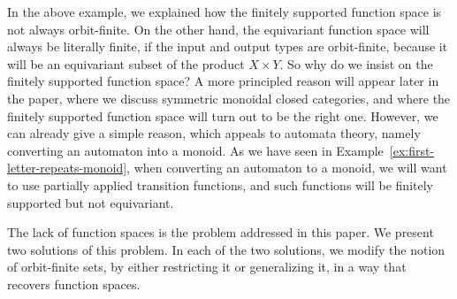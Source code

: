 In the above example, we explained how the finitely supported function space is not always orbit-finite. On the other hand, the equivariant function space will always be literally finite, if the input and output types are orbit-finite, because it will be an equivariant subset of the product $X \times Y$. So why do we insist on the finitely supported function space? A more principled reason will appear later in the paper, where we discuss symmetric monoidal closed categories, and where the finitely supported function space will turn out to be the right one. However, we can already give a simple reason, which appeals to automata theory, namely converting an automaton into a monoid. As we have seen in Example~\ref{ex:first-letter-repeats-monoid}, when converting an automaton to a monoid, we will want to use partially applied transition functions, and such functions will be finitely supported but not equivariant.



 

The lack of function spaces is the problem  addressed in this paper. We present two solutions of this problem. In each of the two solutions, we modify the notion of orbit-finite sets, by either restricting it or generalizing it, in a way that recovers function spaces. 



